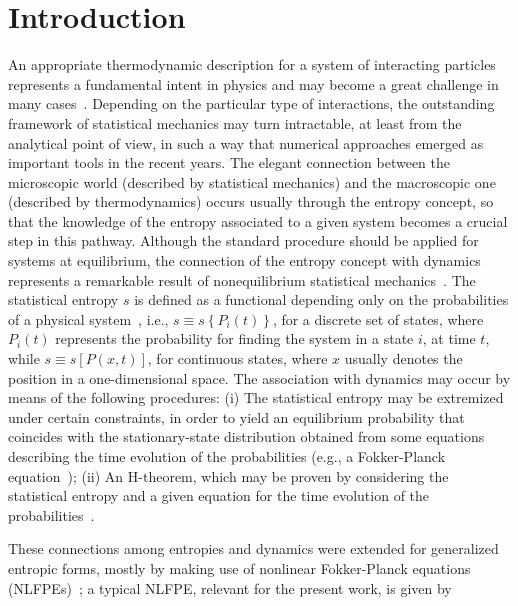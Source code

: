 \documentclass[showpacs,preprintnumbers,amsmath,amssymb,eqsecnum]{revtex4}
\begin{document}
\section{Introduction}


An appropriate thermodynamic description for a system of interacting
particles represents a fundamental intent in physics and may
become a great challenge in many cases~\cite{reif,balian,reichl}.
Depending on the particular type of interactions, the outstanding
framework of statistical mechanics may turn intractable, at least from the
analytical point of view, in such a way that numerical approaches
emerged as important tools in the recent years.
The elegant connection between the microscopic world (described by
statistical mechanics) and the macroscopic one (described
by thermodynamics) occurs usually through the entropy concept,
so that the knowledge of the entropy associated to a given
system becomes a crucial step in this pathway. Although
the standard procedure should be applied for systems at
equilibrium, the connection of the entropy concept with dynamics
represents a remarkable result of nonequilibrium statistical
mechanics~\cite{balian,reichl,balakrishnan}.
The statistical entropy $s$ is defined as a functional depending only
on the probabilities of a physical system~\cite{balian},
i.e., $s \equiv s\left\{P_{i}(t) \right\}$, for a discrete
set of states, where $P_{i}(t)$ represents the probability for finding
the system in a state $i$, at time $t$, while
$s \equiv s[P(x,t)]$, for continuous states, where
$x$ usually denotes the position in a one-dimensional space.
The association with dynamics may occur by means
of the following procedures:
(i) The statistical entropy may be extremized under certain constraints,
in order to yield an equilibrium probability that
coincides with the stationary-state distribution obtained from
some equations describing the time evolution of the probabilities
(e.g., a Fokker-Planck equation~\cite{risken});
(ii) An H-theorem, which may be proven
by considering the statistical entropy and a given equation for the
time evolution of the probabilities~\cite{balian,reichl,balakrishnan,risken}.

These connections among entropies and dynamics were extended
for generalized entropic forms, mostly by making use of nonlinear
Fokker-Planck equations (NLFPEs)~\cite{frankbook}; a typical NLFPE,
relevant for the present work, is given by
\end{document}
